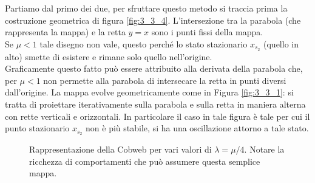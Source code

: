 Partiamo dal primo dei due, per sfruttare questo metodo si traccia prima la costruzione geometrica di figura \ref{fig:3_3_4}. L'intersezione tra la parabola (che rappresenta la mappa) e la retta $y=x$ sono i punti fissi della mappa.\\
Se $\mu < 1$ tale disegno non vale, questo perché lo stato stazionario $x_{s_2}$ (quello in alto) smette di esistere e rimane solo quello nell'origine.\\
Graficamente questo fatto può essere attribuito alla derivata della parabola che, per $\mu < 1$ non permette alla parabola di intersecare la retta in punti diversi dall'origine.
La mappa evolve geometricamente come in Figura \ref{fig:3_3_1}: si tratta di proiettare iterativamente sulla parabola e sulla retta in maniera alterna con rette verticali e orizzontali. In particolare il caso in tale figura è tale per cui il punto stazionario $x_{s_2}$ non è più stabile, si ha una oscillazione attorno a tale stato.\\
\begin{figure}[H]
    \centering
    \caption{\scriptsize Rappresentazione della Cobweb per vari valori di $\lambda  = \mu  / 4$. Notare la ricchezza di comportamenti che può assumere questa semplice mappa.}
    \label{fig:3_3_3}
\end{figure}
